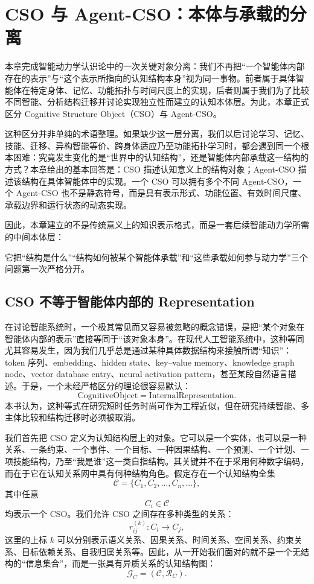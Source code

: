 \chapter{CSO 与 Agent-CSO：本体与承载的分离}

\begin{chapterlead}
本章完成智能动力学认识论中的一次关键对象分离：我们不再把“一个智能体内部存在的表示”与“这个表示所指向的认知结构本身”视为同一事物。前者属于具体智能体在特定身体、记忆、功能拓扑与时间尺度上的实现，后者则属于我们为了比较不同智能、分析结构迁移并讨论实现独立性而建立的认知本体层。为此，本章正式区分 Cognitive Structure Object（CSO）与 Agent-CSO。

这种区分并非单纯的术语整理。如果缺少这一层分离，我们以后讨论学习、记忆、技能、迁移、异构智能等价、跨身体适应乃至功能拓扑学习时，都会遇到同一个根本困难：究竟发生变化的是“世界中的认知结构”，还是智能体内部承载这一结构的方式？本章给出的基本回答是：CSO 描述认知意义上的结构对象；Agent-CSO 描述该结构在具体智能体中的实现。一个 CSO 可以拥有多个不同 Agent-CSO，一个 Agent-CSO 也不是静态符号，而是具有表示形式、功能位置、有效时间尺度、承载边界和运行状态的动态实现。

因此，本章建立的不是传统意义上的知识表示格式，而是一套后续智能动力学所需的中间本体层：
\begin{statementbox}
\centering
{}
\end{statementbox}
它把“结构是什么”“结构如何被某个智能体承载”和“这些承载如何参与动力学”三个问题第一次严格分开。
\end{chapterlead}

\section{CSO 不等于智能体内部的 Representation}

在讨论智能系统时，一个极其常见而又容易被忽略的概念错误，是把“某个对象在智能体内部的表示”直接等同于“该对象本身”。在现代人工智能系统中，这种等同尤其容易发生，因为我们几乎总是通过某种具体数据结构来接触所谓“知识”：token 序列、embedding、hidden state、key--value memory、knowledge graph node、vector database entry、neural activation pattern，甚至某段自然语言描述。于是，一个未经严格区分的理论很容易默认：
\[
\text{CognitiveObject}
=
\text{InternalRepresentation}.
\]
本书认为，这种等式在研究短时任务时尚可作为工程近似，但在研究持续智能、多主体比较和结构迁移时必须被取消。

我们首先把 CSO 定义为认知结构层上的对象。它可以是一个实体，也可以是一种关系、一条约束、一个事件、一个目标、一种因果结构、一个预测、一个计划、一项技能结构，乃至“我是谁”这一类自指结构。其关键并不在于采用何种数字编码，而在于它在认知关系网中具有何种结构角色。假定存在一个认知结构全集
\[
\mathcal C
=
\{C_1,C_2,\ldots,C_n,\ldots\},
\]
其中任意
\[
C_i\in\mathcal C
\]
均表示一个 CSO。我们允许 CSO 之间存在多种类型的关系：
\[
r_{ij}^{(k)}
:
C_i
\rightarrow
C_j,
\]
这里的上标 $k$ 可以分别表示语义关系、因果关系、时间关系、空间关系、约束关系、目标依赖关系、自我归属关系等。因此，从一开始我们面对的就不是一个无结构的“信息集合”，而是一张具有异质关系的认知结构图：
\[
\mathcal G_C
=
(\mathcal C,\mathcal R_C).
\]

